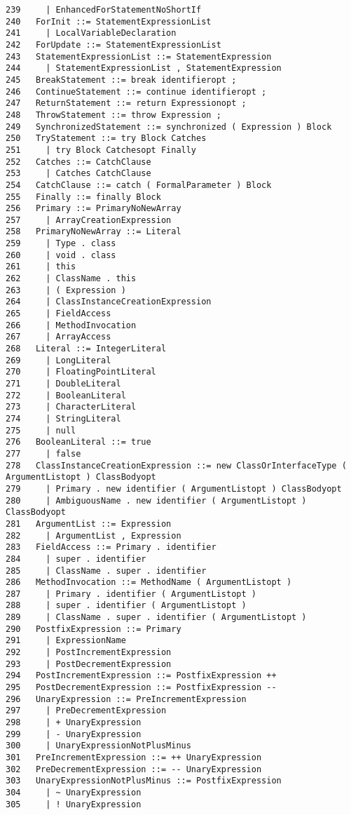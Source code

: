 \begin{verbatim}
239     | EnhancedForStatementNoShortIf
240   ForInit ::= StatementExpressionList
241     | LocalVariableDeclaration
242   ForUpdate ::= StatementExpressionList
243   StatementExpressionList ::= StatementExpression
244     | StatementExpressionList , StatementExpression
245   BreakStatement ::= break identifieropt ;
246   ContinueStatement ::= continue identifieropt ;
247   ReturnStatement ::= return Expressionopt ;
248   ThrowStatement ::= throw Expression ;
249   SynchronizedStatement ::= synchronized ( Expression ) Block
250   TryStatement ::= try Block Catches
251     | try Block Catchesopt Finally
252   Catches ::= CatchClause
253     | Catches CatchClause
254   CatchClause ::= catch ( FormalParameter ) Block
255   Finally ::= finally Block
256   Primary ::= PrimaryNoNewArray
257     | ArrayCreationExpression
258   PrimaryNoNewArray ::= Literal
259     | Type . class
260     | void . class
261     | this
262     | ClassName . this
263     | ( Expression )
264     | ClassInstanceCreationExpression
265     | FieldAccess
266     | MethodInvocation
267     | ArrayAccess
268   Literal ::= IntegerLiteral
269     | LongLiteral
270     | FloatingPointLiteral
271     | DoubleLiteral
272     | BooleanLiteral
273     | CharacterLiteral
274     | StringLiteral
275     | null
276   BooleanLiteral ::= true
277     | false
278   ClassInstanceCreationExpression ::= new ClassOrInterfaceType ( ArgumentListopt ) ClassBodyopt
279     | Primary . new identifier ( ArgumentListopt ) ClassBodyopt
280     | AmbiguousName . new identifier ( ArgumentListopt ) ClassBodyopt
281   ArgumentList ::= Expression
282     | ArgumentList , Expression
283   FieldAccess ::= Primary . identifier
284     | super . identifier
285     | ClassName . super . identifier
286   MethodInvocation ::= MethodName ( ArgumentListopt )
287     | Primary . identifier ( ArgumentListopt )
288     | super . identifier ( ArgumentListopt )
289     | ClassName . super . identifier ( ArgumentListopt )
290   PostfixExpression ::= Primary
291     | ExpressionName
292     | PostIncrementExpression
293     | PostDecrementExpression
294   PostIncrementExpression ::= PostfixExpression ++
295   PostDecrementExpression ::= PostfixExpression --
296   UnaryExpression ::= PreIncrementExpression
297     | PreDecrementExpression
298     | + UnaryExpression
299     | - UnaryExpression
300     | UnaryExpressionNotPlusMinus
301   PreIncrementExpression ::= ++ UnaryExpression
302   PreDecrementExpression ::= -- UnaryExpression
303   UnaryExpressionNotPlusMinus ::= PostfixExpression
304     | ~ UnaryExpression
305     | ! UnaryExpression

\end{verbatim}
